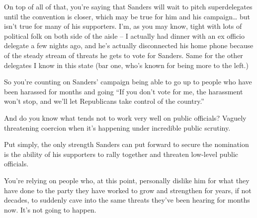 \documentclass[11pt]{article}
\begin{document}
\begin{itemize}
On top of all of that, you’re saying that Sanders will wait to pitch superdelegates until the convention is closer, which may be true for him and his campaign… but isn’t true for many of his supporters. I’m, as you may know, tight with lots of political folk on both side of the aisle – I actually had dinner with an ex officio delegate a few nights ago, and he’s actually disconnected his home phone because of the steady stream of threats he gets to vote for Sanders. Same for the other delegates I know in this state (bar one, who’s known for being more to the left.)

So you’re counting on Sanders’ campaign being able to go up to people who have been harassed for months and going “If you don’t vote for me, the harassment won’t stop, and we’ll let Republicans take control of the country.”

And do you know what tends not to work very well on public officials? Vaguely threatening coercion when it’s happening under incredible public scrutiny.

Put simply, the only strength Sanders can put forward to secure the nomination is the ability of his supporters to rally together and threaten low-level public officials.

You’re relying on people who, at this point, personally dislike him for what they have done to the party they have worked to grow and strengthen for years, if not decades, to suddenly cave into the same threats they’ve been hearing for months now. It’s not going to happen.
\end{itemize}
\stopcontents[level-4]
\end{document}
